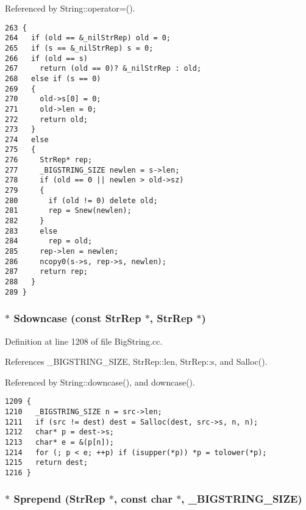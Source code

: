 Referenced by String::operator=().



\footnotesize\begin{verbatim}263 {
264   if (old == &_nilStrRep) old = 0;
265   if (s == &_nilStrRep) s = 0;
266   if (old == s) 
267     return (old == 0)? &_nilStrRep : old;
268   else if (s == 0)
269   {
270     old->s[0] = 0;
271     old->len = 0;
272     return old;
273   }
274   else 
275   {
276     StrRep* rep;
277     _BIGSTRING_SIZE newlen = s->len;
278     if (old == 0 || newlen > old->sz)
279     {
280       if (old != 0) delete old;
281       rep = Snew(newlen);
282     }
283     else
284       rep = old;
285     rep->len = newlen;
286     ncopy0(s->s, rep->s, newlen);
287     return rep;
288   }
289 }
\end{verbatim}\normalsize 
{}
\subsubsection{$\ast$ Sdowncase (const {\bf Str\-Rep} $\ast$, {\bf Str\-Rep} $\ast$)}\label{BigString_8hh_a23}




Definition at line 1208 of file Big\-String.cc.

References \_\-BIGSTRING\_\-SIZE, Str\-Rep::len, Str\-Rep::s, and Salloc().

Referenced by String::downcase(), and downcase().



\footnotesize\begin{verbatim}1209 {
1210   _BIGSTRING_SIZE n = src->len;
1211   if (src != dest) dest = Salloc(dest, src->s, n, n);
1212   char* p = dest->s;
1213   char* e = &(p[n]);
1214   for (; p < e; ++p) if (isupper(*p)) *p = tolower(*p);
1215   return dest;
1216 }
\end{verbatim}\normalsize 
{}
\subsubsection{$\ast$ Sprepend ({\bf Str\-Rep} $\ast$, const char $\ast$, {\bf \_\-BIGSTRING\_\-SIZE})}\label{BigString_8hh_a20}




